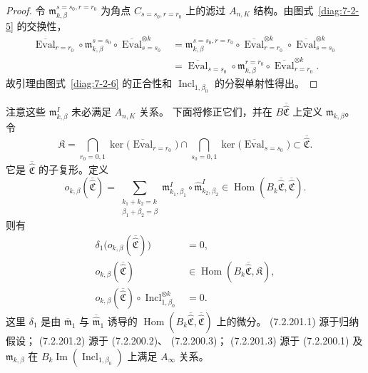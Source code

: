 \begin{proof}
令 $\mathfrak m^{s=s_0,r=r_0}_{k,\beta}$
为角点 $C_{s=s_0,r=r_0}$ 上的滤过
$A_{n,K}$ 结构。由图式~\ref{diag:7-2-5}
的交换性，
\[
\begin{aligned}
\overline{\operatorname{Eval}}_{r=r_0}
\circ\mathfrak m^{s=s_0}_{k,\beta}
\circ\overline{\operatorname{Eval}}_{s=s_0}^{\otimes k}
&=\mathfrak m^{s=s_0,r=r_0}_{k,\beta}
\circ\overline{\operatorname{Eval}}_{r=r_0}^{\otimes k}
\circ\overline{\operatorname{Eval}}_{s=s_0}^{\otimes k}\\
&=\overline{\operatorname{Eval}}_{s=s_0}
\circ\mathfrak m^{r=r_0}_{k,\beta}
\circ\overline{\operatorname{Eval}}_{r=r_0}^{\otimes k}.
\end{aligned}
\]
故引理由图式~\ref{diag:7-2-6}
的正合性和
$\operatorname{Incl}_{1,\beta_0}$
的分裂单射性得出。
\end{proof}

注意这些 $\mathfrak m^I_{k,\beta}$
未必满足 $A_{n,K}$ 关系。
下面将修正它们，并在
$B\overline{\widehat{\mathfrak C}}$
上定义 $\mathfrak m_{k,\beta}$。
令
\[
\mathfrak K=
\bigcap_{r_0=0,1}
\ker\bigl(\overline{\operatorname{Eval}}_{r=r_0}\bigr)
\cap
\bigcap_{s_0=0,1}
\ker\bigl(\overline{\operatorname{Eval}}_{s=s_0}\bigr)
\subset\overline{\widehat{\mathfrak C}}.
\]
它是 $\overline{\widehat{\mathfrak C}}$
的子复形。定义
\[
o_{k,\beta}
(\overline{\widehat{\mathfrak C}})
=\sum_{\substack{k_1+k_2=k\\\beta_1+\beta_2=\beta}}
\mathfrak m^I_{k_1,\beta_1}
\circ\widehat{\mathfrak m}^I_{k_2,\beta_2}
\in\operatorname{Hom}
(B_k\overline{\widehat{\mathfrak C}},
\overline{\widehat{\mathfrak C}}).
\]
则有
\begin{align}
\delta_1\bigl(o_{k,\beta}
(\overline{\widehat{\mathfrak C}})\bigr)
&=0,
\tag{7.2.201.1}\label{eq:7-2-201-1}\\
o_{k,\beta}
(\overline{\widehat{\mathfrak C}})
&\in\operatorname{Hom}
(B_k\overline{\widehat{\mathfrak C}},
\mathfrak K),
\tag{7.2.201.2}\label{eq:7-2-201-2}\\
o_{k,\beta}
(\overline{\widehat{\mathfrak C}})
\circ\operatorname{Incl}_{1,\beta_0}^{\otimes k}
&=0.
\tag{7.2.201.3}\label{eq:7-2-201-3}
\end{align}
这里 $\delta_1$ 是由
$\overline{\mathfrak m}_1$
与 $\overline{\widehat{\mathfrak m}}_1$
诱导的
$\operatorname{Hom}
(B_k\overline{\widehat{\mathfrak C}},
\overline{\widehat{\mathfrak C}})$
上的微分。
(7.2.201.1) 源于归纳假设；
(7.2.201.2) 源于 (7.2.200.2)、
(7.2.200.3)；
(7.2.201.3) 源于 (7.2.200.1)
及 $\mathfrak m_{k,\beta}$
在 $B_k\operatorname{Im}
(\operatorname{Incl}_{1,\beta_0})$
上满足 $A_\infty$ 关系。

